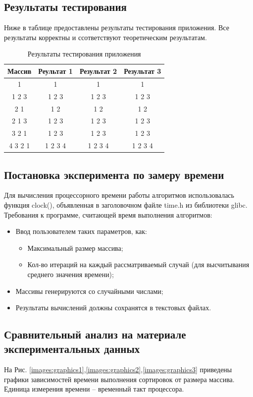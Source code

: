 \documentclass[a4paper,12pt]{article}
\begin{document}
\subsection{Результаты тестирования}
Ниже в таблице предоставлены результаты тестирования приложения.
Все результаты корректны и ссответствуют теоретическим результатам.
\begin{table}[h]
\caption{\label{tablice:tests}Результаты тестирования приложения}
\begin{center}
\begin{tabular}{|c|c|c|c|}
\hline
Массив & Реультат 1 & Результат 2 & Результат 3 \\
\hline
1 & 1 & 1 & 1 \\
\hline
1 2 3 & 1 2 3 & 1 2 3 & 1 2 3 \\
\hline
2 1 & 1 2 & 1 2 & 1 2 \\
\hline
2 1 3 & 1 2 3 & 1 2 3 & 1 2 3 \\
\hline
3 2 1 & 1 2 3 & 1 2 3 & 1 2 3 \\
\hline
4 3 2 1 & 1 2 3 4 & 1 2 3 4 & 1 2 3 4 \\
\hline
\end{tabular}
\end{center}
\end{table}

\newpage
\subsection{Постановка эксперимента по замеру времени}
Для вычисления процессорного времени работы алгоритмов использовалась функция clock(), объявленная в заголовочном файле time.h из библиотеки glibc. \\
Требования к программе, считающей время выполнения алгоритмов:
\begin{itemize}
\item Ввод пользователем таких параметров, как:
\begin{itemize}
\item Максимальный размер массива;
\item Кол-во итераций на каждый рассматриваемый случай (для высчитывания среднего значения времени);
\end{itemize}
\item Массивы генерируются со случайными числами;
\item Результаты вычислений должны сохранятся в текстовых файлах.
\end{itemize}

\newpage
\subsection{Сравнительный анализ на материале экспериментальных данных}
На Рис. \ref{images:graphics1},\ref{images:graphics2},\ref{images:graphics3} приведены графики зависимостей времени выполнения сортировок от размера массива. Единица измерения времени – временный такт процессора. \\
\end{document}
